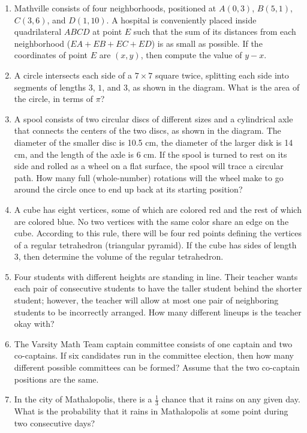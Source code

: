 \documentclass[11pt]{article}
\begin{document}
\begin{enumerate}[1.]
			\item Mathville consists of four neighborhoods, positioned at $A(0, 3)$, $B(5, 1)$, $C(3, 6)$, and $D(1, 10)$. A hospital is conveniently placed inside quadrilateral $ABCD$ at point $E$ such that the sum of its distances from each neighborhood ($EA + EB + EC + ED$) is as small as possible. If the coordinates of point $E$ are $(x, y)$, then compute the value of $y - x$.
			
			\item A circle intersects each side of a $7 \times 7$ square twice, splitting each side into segments of lengths $3$, $1$, and $3$, as shown in the diagram. What is the area of the circle, in terms of $\pi$?
			
			\item A spool consists of two circular discs of different sizes and a cylindrical axle that connects the centers of the two discs, as shown in the diagram. The diameter of the smaller disc is 10.5 cm, the diameter of the larger disk is 14 cm, and the length of the axle is 6 cm. If the spool is turned to rest on its side and rolled as a wheel on a flat surface, the spool will trace a circular path. How many full (whole-number) rotations will the wheel make to go around the circle once to end up back at its starting position?
			
			\item A cube has eight vertices, some of which are colored red and the rest of which are colored blue. No two vertices with the same color share an edge on the cube. According to this rule, there will be four red points defining the vertices of a regular tetrahedron (triangular pyramid). If the cube has sides of length 3, then determine the volume of the regular tetrahedron.
			
			\item Four students with different heights are standing in line. Their teacher wants each pair of consecutive students to have the taller student behind the shorter student; however, the teacher will allow at most one pair of neighboring students to be incorrectly arranged. How many different lineups is the teacher okay with?
			
			\item The Varsity Math Team captain committee consists of one captain and two co-captains. If six candidates run in the committee election, then how many different possible committees can be formed? Assume that the two co-captain positions are the same.
			
			\item In the city of Mathalopolis, there is a $\frac{1}{3}$ chance that it rains on any given day. What is the probability that it rains in Mathalopolis at some point during two consecutive days?
			

\end{enumerate}
\end{document}
